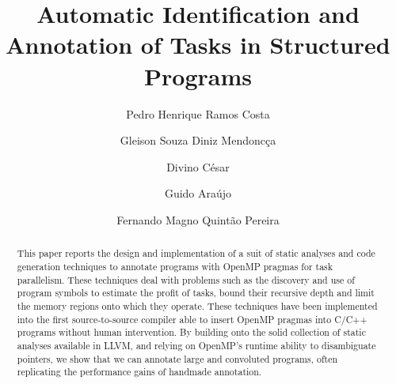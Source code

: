 \documentclass[sigplan,10pt,review,anonymous]{acmart}
\begin{document}
\title[Automatic Identification and Annotation of Tasks in Structured
Programs]
{Automatic Identification and Annotation of Tasks in Structured Programs}

\author{Pedro Henrique Ramos Costa}

\author{Gleison Souza Diniz Mendonc\c{c}a}

\author{Divino C\'{e}sar}

\author{Guido Ara\'{u}jo}

\author{Fernando Magno Quint\~{a}o Pereira}

\begin{abstract}
This paper reports the design and implementation of a suit of static analyses
and code generation techniques to annotate programs with OpenMP pragmas for
task parallelism.
These techniques deal with problems such as the discovery and use of program
symbols to estimate the profit of tasks, bound their recursive depth and limit
the memory regions onto which they operate.
These techniques have been implemented into the first source-to-source
compiler able to insert OpenMP pragmas into C/C++ programs without human
intervention.
By building onto the solid collection of static analyses available in LLVM,
and relying on OpenMP's runtime ability to disambiguate pointers, we show that
we can annotate large and convoluted programs, often replicating the performance
gains of handmade annotation.
\end{abstract}
\end{document}
